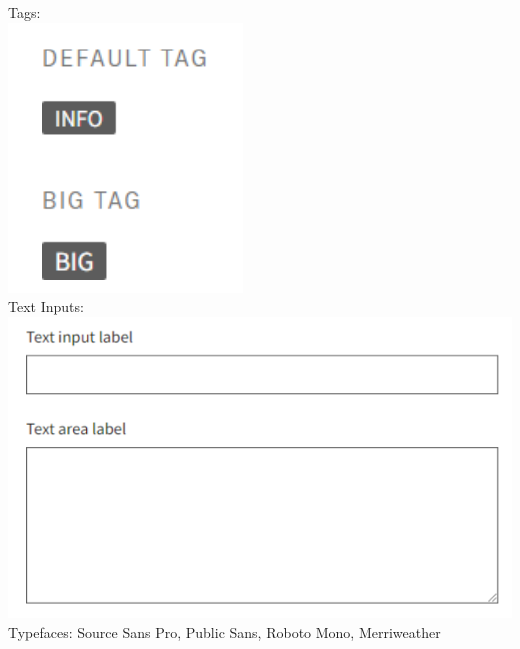 \documentclass{article}
\begin{document}
Tags: \\
\includegraphics{tags} \\
Text Inputs: \\
\includegraphics{text_inputs} \\
Typefaces: Source Sans Pro, Public Sans, Roboto Mono, Merriweather
\end{document}
